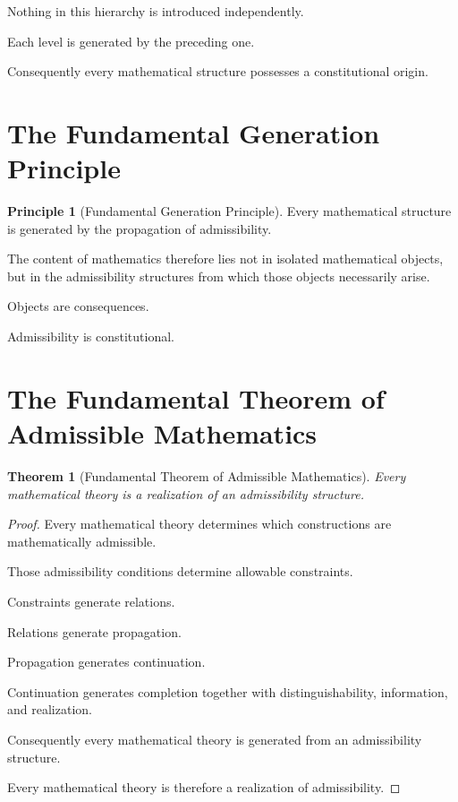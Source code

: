 \documentclass[13pt,openany]{book}
\theoremstyle{plain}
\newtheorem{theorem}{Theorem}[chapter]
\theoremstyle{definition}
\newtheorem{principle}{Principle}[chapter]
\begin{document}
Nothing in this hierarchy is introduced independently.

Each level is generated by the preceding one.

Consequently every mathematical structure possesses a constitutional origin.

\section{The Fundamental Generation Principle}

\begin{principle}[Fundamental Generation Principle]
Every mathematical structure is generated by the propagation of admissibility.
\end{principle}

The content of mathematics therefore lies not in isolated mathematical objects,
but in the admissibility structures from which those objects necessarily arise.

Objects are consequences.

Admissibility is constitutional.

\section{The Fundamental Theorem of Admissible Mathematics}

\begin{theorem}[Fundamental Theorem of Admissible Mathematics]
Every mathematical theory is a realization of an admissibility structure.
\end{theorem}

\begin{proof}
Every mathematical theory determines which constructions are mathematically
admissible.

Those admissibility conditions determine allowable constraints.

Constraints generate relations.

Relations generate propagation.

Propagation generates continuation.

Continuation generates completion together with distinguishability,
information, and realization.

Consequently every mathematical theory is generated from an admissibility
structure.

Every mathematical theory is therefore a realization of admissibility.
\end{proof}
\end{document}
